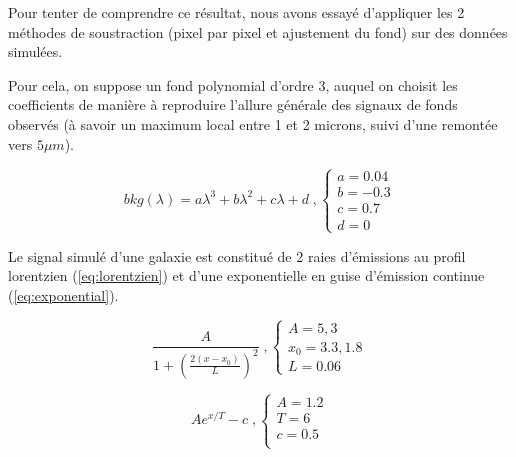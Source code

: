 \documentclass[12pt, a4paper]{article}
\begin{document}
Pour tenter de comprendre ce résultat, nous avons essayé d'appliquer les 2 méthodes de soustraction (pixel par pixel et ajustement du fond) sur des données simulées.

Pour cela, on suppose un fond polynomial d'ordre 3, auquel on choisit les coefficients de manière à reproduire l'allure générale des signaux de fonds observés (à savoir un maximum local entre 1 et 2 microns, suivi d'une remontée vers $5 \mu m$).

\begin{equation}
  bkg(\lambda) = a \lambda^3 + b \lambda^2 + c \lambda + d \; , 
  \begin{cases}
    a = 0.04\\
    b = -0.3\\
    c = 0.7\\
    d = 0
  \end{cases}
\end{equation}

Le signal simulé d'une galaxie est constitué de 2 raies d'émissions au profil lorentzien (\ref{eq:lorentzien}) et d'une exponentielle en guise d'émission continue (\ref{eq:exponential}).

\begin{equation}
  \label{eq:lorentzien}
  \frac{A}{1 + (\frac{2(x-x_0)}{L})^2} \; ,
  \begin{cases}
   A = 5,3\\
   x_0 = 3.3, 1.8\\
   L = 0.06
  \end{cases}
\end{equation}

\begin{equation}
  \label{eq:exponential}
  A e^{x/T} - c \; ,
  \begin{cases}
   A = 1.2\\
   T = 6\\
   c = 0.5\\
  \end{cases}
\end{equation}
\end{document}
